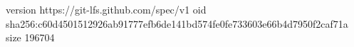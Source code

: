 version https://git-lfs.github.com/spec/v1
oid sha256:c60d4501512926ab91777efb6de141bd574fe0fe733603e66b4d7950f2caf71a
size 196704
